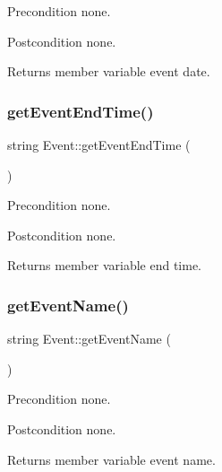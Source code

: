 \begin{DoxyPrecond}{Precondition}
none. 
\end{DoxyPrecond}
\begin{DoxyPostcond}{Postcondition}
none. 
\end{DoxyPostcond}
\begin{DoxyReturn}{Returns}
member variable event date. 
\end{DoxyReturn}
\mbox{\label{class_event_a2d87965673185f8b5be533b67ac41deb}} 
\subsubsection{\texorpdfstring{get\+Event\+End\+Time()}{getEventEndTime()}}
{\footnotesize\ttfamily string Event\+::get\+Event\+End\+Time (\begin{DoxyParamCaption}{ }\end{DoxyParamCaption})}

\begin{DoxyPrecond}{Precondition}
none. 
\end{DoxyPrecond}
\begin{DoxyPostcond}{Postcondition}
none. 
\end{DoxyPostcond}
\begin{DoxyReturn}{Returns}
member variable end time. 
\end{DoxyReturn}
\mbox{\label{class_event_ab13410739cd27089f2f9f56b60f18836}} 
\subsubsection{\texorpdfstring{get\+Event\+Name()}{getEventName()}}
{\footnotesize\ttfamily string Event\+::get\+Event\+Name (\begin{DoxyParamCaption}{ }\end{DoxyParamCaption})}

\begin{DoxyPrecond}{Precondition}
none. 
\end{DoxyPrecond}
\begin{DoxyPostcond}{Postcondition}
none. 
\end{DoxyPostcond}
\begin{DoxyReturn}{Returns}
member variable event name. 
\end{DoxyReturn}
\mbox{\label{class_event_a9c77702f7c3d0246379b89f90f175774}} 
